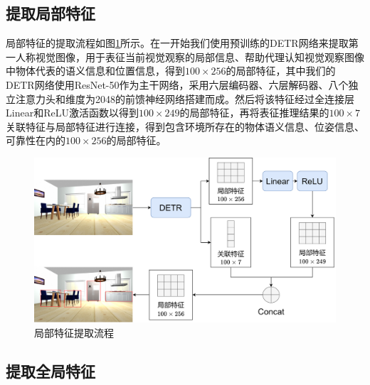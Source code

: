 \subsection{提取局部特征}
局部特征的提取流程如图\ref{局部特征提取}所示。在一开始我们使用预训练的DETR网络来提取第一人称视觉图像，用于表征当前视觉观察的局部信息、帮助代理认知视觉观察图像中物体代表的语义信息和位置信息，得到$100 \times 256$的局部特征，其中我们的DETR网络使用ResNet-50作为主干网络，采用六层编码器、六层解码器、八个独立注意力头和维度为2048的前馈神经网络搭建而成。然后将该特征经过全连接层Linear和ReLU激活函数以得到$100 \times 249$的局部特征，再将表征推理结果的$100 \times 7$关联特征与局部特征进行连接，得到包含环境所存在的物体语义信息、位姿信息、可靠性在内的$100 \times 256$的局部特征。
\begin{figure}[htbp]
    \centering
    \includegraphics[scale=0.06]{Fig/局部特征提取.png}
    \caption{\label{局部特征提取}局部特征提取流程}
\end{figure}

\subsection{提取全局特征}


